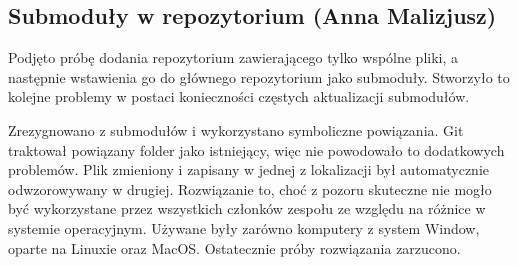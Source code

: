 \documentclass[10pt,twoside,a4paper]{report}
\begin{document}
\subsection{Submoduły w repozytorium (Anna Malizjusz)}
\par Podjęto próbę dodania repozytorium zawierającego tylko wspólne pliki, a następnie wstawienia go do głównego repozytorium jako submoduły. Stworzyło to kolejne problemy w postaci konieczności częstych aktualizacji submodułów.
\par Zrezygnowano z submodułów i wykorzystano symboliczne powiązania.
Git traktował powiązany folder jako istniejący, więc nie powodowało to dodatkowych problemów. Plik zmieniony i zapisany w jednej z lokalizacji był automatycznie odwzorowywany w drugiej. Rozwiązanie to, choć z pozoru skuteczne nie mogło być wykorzystane przez wszystkich członków zespołu ze względu na różnice w systemie operacyjnym. Używane były zarówno komputery z system Window, oparte na Linuxie oraz MacOS. Ostatecznie próby rozwiązania zarzucono.
\end{document}
